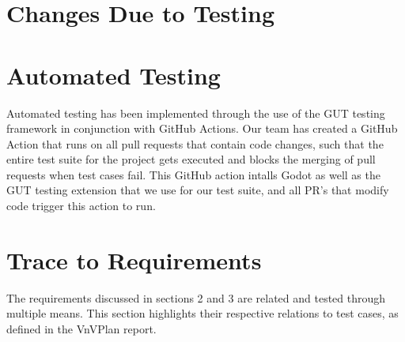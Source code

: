 \documentclass[12pt, titlepage]{article}
\begin{document}
\newpage
\section{Changes Due to Testing}


\newpage
\section{Automated Testing}

Automated testing has been implemented through the use of the GUT testing framework in conjunction with GitHub Actions. Our team has created a GitHub Action that runs on all pull requests that contain code changes, such that the entire test suite for the project gets executed and blocks the merging of pull requests when test cases fail. This GitHub action intalls Godot as well as the GUT testing extension that we use for our test suite, and all PR's that modify code trigger this action to run.

\newpage
\section{Trace to Requirements}

The requirements discussed in sections 2 and 3 are related and tested through multiple means. This section highlights their respective relations to test cases, as defined in the VnVPlan report.
\end{document}
